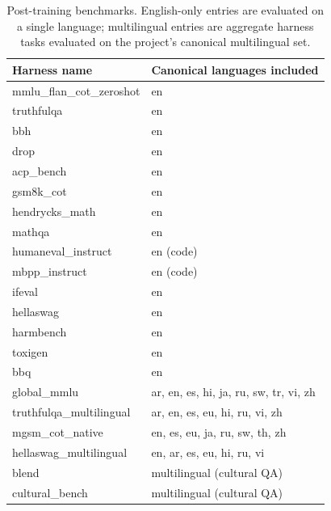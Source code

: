 \begin{table}[t]
\centering
\caption{Post-training benchmarks. English-only entries are evaluated on a single language; multilingual entries are aggregate harness tasks evaluated on the project's canonical multilingual set.}
\label{tab:posttraining-benchmarks}
\begin{tabular}{ll}
\toprule
\textbf{Harness name} & \textbf{Canonical languages included} \\
\midrule
mmlu\_flan\_cot\_zeroshot   & en \\
truthfulqa                  & en \\
bbh                         & en \\
drop                        & en \\
acp\_bench                  & en \\
gsm8k\_cot                  & en \\
hendrycks\_math             & en \\
mathqa                      & en \\
humaneval\_instruct         & en (code) \\
mbpp\_instruct              & en (code) \\
ifeval                      & en \\
hellaswag                   & en \\
harmbench                   & en \\
toxigen                     & en \\
bbq                         & en \\
global\_mmlu                & ar, en, es, hi, ja, ru, sw, tr, vi, zh \\
truthfulqa\_multilingual    & ar, en, es, eu, hi, ru, vi, zh \\
mgsm\_cot\_native           & en, es, eu, ja, ru, sw, th, zh \\
hellaswag\_multilingual     & en, ar, es, eu, hi, ru, vi \\
blend                       & multilingual (cultural QA) \\
cultural\_bench             & multilingual (cultural QA) \\
\bottomrule
\end{tabular}
\end{table}
